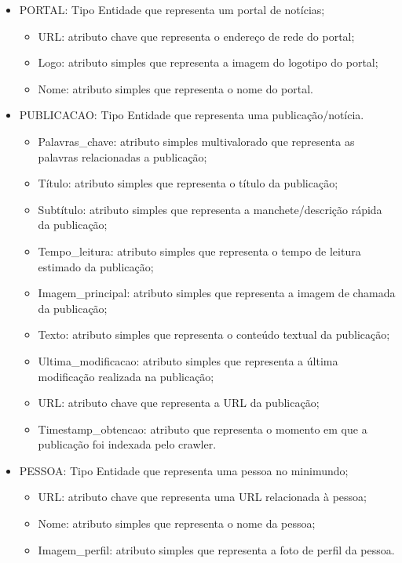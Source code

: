 \documentclass{article}
\begin{document}
\begin{itemize}
				\item PORTAL: Tipo Entidade que representa um portal de notícias;

\begin{itemize}
\item URL: atributo chave que representa o endereço de rede do portal;
\item Logo: atributo simples que representa a imagem do logotipo do portal;
\item Nome: atributo simples que representa o nome do portal.
\end{itemize}
\end{itemize}
\begin{itemize}
\item PUBLICACAO: Tipo Entidade que representa uma publicação/notícia.
\begin{itemize}
\item Palavras\_chave: atributo simples multivalorado que representa as palavras relacionadas a publicação;
\item Título: atributo simples que representa o título da publicação;
\item Subtítulo: atributo simples que representa a manchete/descrição rápida da publicação;
\item Tempo\_leitura: atributo simples que representa o tempo de leitura estimado da publicação;
\item Imagem\_principal: atributo simples que representa a imagem de chamada da publicação;
\item Texto: atributo simples que representa o conteúdo textual da publicação;
\item Ultima\_modificacao: atributo simples que representa a última modificação realizada na publicação;
\item URL: atributo chave que representa a URL da publicação;
\item Timestamp\_obtencao: atributo que representa o momento em que a publicação foi indexada pelo crawler.

\end{itemize}
\end{itemize}
\begin{itemize}

\item PESSOA: Tipo Entidade que representa uma pessoa no minimundo;
\begin{itemize}
\item URL: atributo chave que representa uma URL relacionada à pessoa;
\item Nome: atributo simples que representa o nome da pessoa;
\item Imagem\_perfil: atributo simples que representa a foto de perfil da pessoa.
\end{itemize}
\end{itemize}
\end{document}
